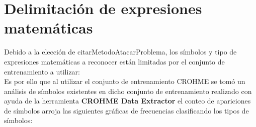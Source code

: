 \newpage
\section{Delimitación de expresiones matemáticas}

Debido a la elección de citarMetodoAtacarProblema, los símbolos y tipo de expresiones matemáticas a reconocer están limitadas por el conjunto de entrenamiento a utilizar:
\\
Es por ello que al utilizar el conjunto de entrenamiento CROHME \cite{CROHME}
se tomó un análisis de símbolos existentes en dicho conjunto de entrenamiento realizado con ayuda de la herramienta \textbf{CROHME Data Extractor} \cite{EXTRACTOR} el conteo de apariciones de símbolos arroja las siguientes gráficas de frecuencias clasificando los tipos de símbolos:\\

